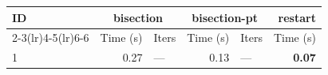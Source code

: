 \begin{longtable}{lr@{\hskip 4pt}l@{\hskip 12pt}r@{\hskip 4pt}l@{\hskip 12pt}r}
\toprule
ID & \multicolumn{2}{c}{bisection} & \multicolumn{2}{c}{bisection-pt} & restart \\
\cmidrule(lr){2-3}\cmidrule(lr){4-5}\cmidrule(lr){6-6}
 & Time (s) &  Iters & Time (s) &  Iters & Time (s) \\
\midrule
\endhead
1 & 0.27 & --- & 0.13 & --- & \textbf{0.07} \\
\bottomrule
\end{longtable}